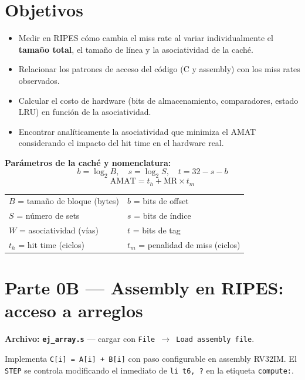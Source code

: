 \documentclass[12pt, a4paper]{article}
\newcommand{\ripesbtn}[1]{\texttt{#1}}
\newcommand{\archivo}[1]{\texttt{\textbf{#1}}}
\begin{document}
\section*{Objetivos}

\begin{itemize}
    \item Medir en RIPES cómo cambia el miss rate al variar individualmente
          el \textbf{tamaño total}, el tamaño de línea y la
          asociatividad de la caché.
    \item Relacionar los patrones de acceso del código (C y assembly) con
          los miss rates observados.
    \item Calcular el costo de hardware (bits de almacenamiento, comparadores,
          estado LRU) en función de la asociatividad.
    \item Encontrar analíticamente la asociatividad que minimiza el AMAT
          considerando el impacto del hit time en el hardware real.
\end{itemize}

\begin{referencia}
    \textbf{Parámetros de la caché y nomenclatura:}
    \[
        b = \log_2 B, \quad
        s = \log_2 S, \quad
        t = 32 - s - b
    \]
    \[
        \text{AMAT} = t_h + \text{MR} \times t_m
    \]
    \begin{tabular}{ll}
        $B$ = tamaño de bloque (bytes) &
        $b$ = bits de offset \\
        $S$ = número de sets &
        $s$ = bits de índice \\
        $W$ = asociatividad (vías) &
        $t$ = bits de tag \\
        $t_h$ = hit time (ciclos) &
        $t_m$ = penalidad de miss (ciclos) \\
    \end{tabular}
\end{referencia}

\newpage

\section{Parte 0B — Assembly en RIPES: acceso a arreglos}

\begin{nota}
    \textbf{Archivo:} \archivo{ej\_array.s} — cargar con
    \ripesbtn{File $\to$ Load assembly file}.

    Implementa \texttt{C[i] = A[i] + B[i]} con paso configurable en assembly RV32IM.
    El \texttt{STEP} se controla modificando el inmediato de \texttt{li t6, ?}
    en la etiqueta \texttt{compute:}.
\end{nota}
\end{document}
